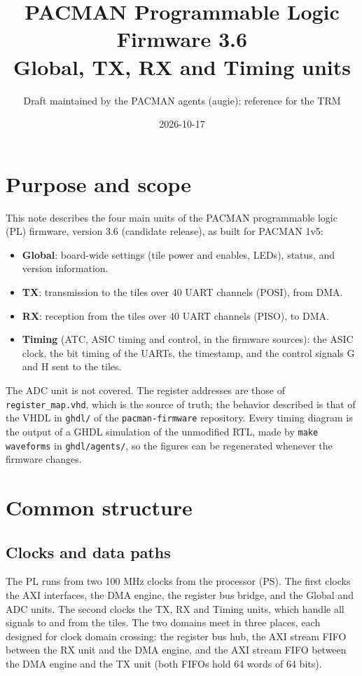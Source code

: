 \documentclass[12pt]{article}
\title{PACMAN Programmable Logic Firmware 3.6\\[2pt]
  \large Global, TX, RX and Timing units}
\author{Draft maintained by the PACMAN agents (augie); reference for the TRM}
\date{2026-10-17}
\begin{document}
\maketitle
\sloppy

\section{Purpose and scope}

This note describes the four main units of the PACMAN programmable logic (PL) firmware, version 3.6
(candidate release), as built for PACMAN 1v5:
\begin{itemize}
\item {\bf Global}: board-wide settings (tile power and enables, LEDs), status, and version information.
\item {\bf TX}: transmission to the tiles over 40 UART channels (POSI), from DMA.
\item {\bf RX}: reception from the tiles over 40 UART channels (PISO), to DMA.
\item {\bf Timing} (ATC, ASIC timing and control, in the firmware sources): the ASIC clock, the bit timing
  of the UARTs, the timestamp, and the control signals G and H sent to the tiles.
\end{itemize}
The ADC unit is not covered.  The register addresses are those of {\tt register\_map.vhd}, which is the
source of truth; the behavior described is that of the VHDL in {\tt ghdl/} of the {\tt pacman-firmware}
repository.  Every timing diagram is the output of a GHDL simulation of the unmodified RTL, made by {\tt make
  waveforms} in {\tt ghdl/agents/}, so the figures can be regenerated whenever the firmware changes.

\section{Common structure}

\subsection{Clocks and data paths}

The PL runs from two 100 MHz clocks from the processor (PS).  The first clocks the AXI interfaces, the DMA
engine, the register bus bridge, and the Global and ADC units.  The second clocks the TX, RX and Timing
units, which handle all signals to and from the tiles.  The two domains meet in three places, each designed
for clock domain crossing: the register bus hub, the AXI stream FIFO between the RX unit and the DMA engine,
and the AXI stream FIFO between the DMA engine and the TX unit (both FIFOs hold 64 words of 64 bits).
\end{document}
